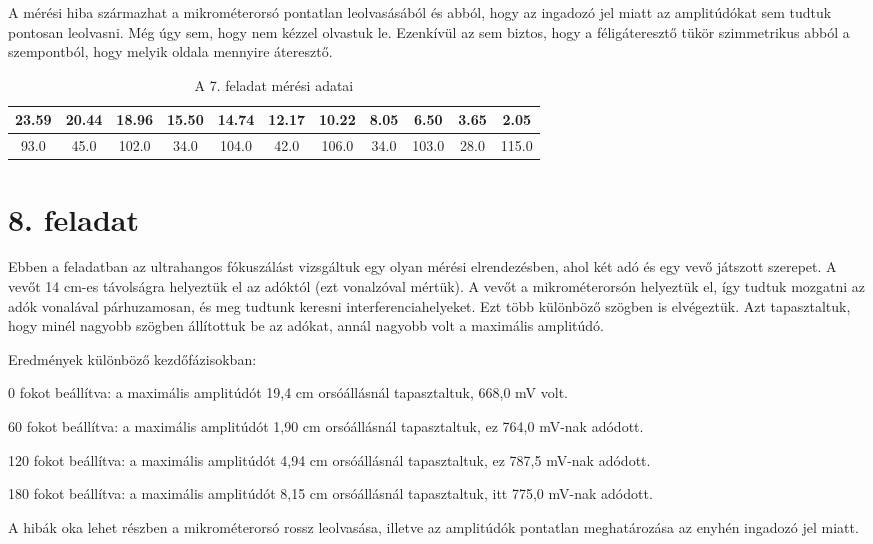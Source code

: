 \documentclass{article}
\begin{document}
A mérési hiba származhat a mikrométerorsó pontatlan leolvasásából és abból, hogy az ingadozó jel miatt az amplitúdókat sem tudtuk pontosan leolvasni. Még úgy sem, hogy nem kézzel olvastuk le. Ezenkívül az sem biztos, hogy a féligáteresztő tükör szimmetrikus abból a szempontból, hogy melyik oldala mennyire áteresztő.

\begin{table}[H]
    \centering
    \begin{tabular}{|c|c|c|c|c|c|c|c|c|c|c|}
        \hline
        23.59 & 20.44 & 18.96 & 15.50 & 14.74 & 12.17 & 10.22 & 8.05 & 6.50 & 3.65 & 2.05 \\ \hline
        93.0 & 45.0 & 102.0 & 34.0 & 104.0 & 42.0 & 106.0 & 34.0 & 103.0 & 28.0 & 115.0 \\ \hline
    \end{tabular}
    \caption{A 7. feladat mérési adatai}
\end{table}


\section*{8. feladat}

Ebben a feladatban az ultrahangos fókuszálást vizsgáltuk egy olyan mérési elrendezésben, ahol két adó és egy vevő játszott szerepet. A vevőt 14 cm-es távolságra helyeztük el az adóktól (ezt vonalzóval mértük). A vevőt a mikrométerorsón helyeztük el, így tudtuk mozgatni az adók vonalával párhuzamosan, és meg tudtunk keresni interferenciahelyeket. Ezt több különböző szögben is elvégeztük. Azt tapasztaltuk, hogy minél nagyobb szögben állítottuk be az adókat, annál nagyobb volt a maximális amplitúdó.

Eredmények különböző kezdőfázisokban:

0 fokot beállítva: a maximális amplitúdót 19,4 cm orsóállásnál tapasztaltuk, 668,0 mV volt.

60 fokot beállítva: a maximális amplitúdót 1,90 cm orsóállásnál tapasztaltuk, ez 764,0 mV-nak adódott.

120 fokot beállítva: a maximális amplitúdót 4,94 cm orsóállásnál tapasztaltuk, ez 787,5 mV-nak adódott.

180 fokot beállítva: a maximális amplitúdót 8,15 cm orsóállásnál tapasztaltuk, itt 775,0 mV-nak adódott.

A hibák oka lehet részben a mikrométerorsó rossz leolvasása, illetve az amplitúdók pontatlan meghatározása az enyhén ingadozó jel miatt.
\end{document}
